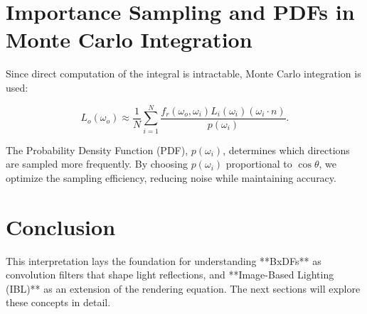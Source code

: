 \documentclass{article}
\begin{document}
\section{Importance Sampling and PDFs in Monte Carlo Integration}
Since direct computation of the integral is intractable, Monte Carlo integration is used:

\begin{equation}
L_o(\omega_o) \approx \frac{1}{N} \sum_{i=1}^{N} \frac{f_r(\omega_o, \omega_i) L_i(\omega_i) (\omega_i \cdot n)}{p(\omega_i)}.
\end{equation}

The Probability Density Function (PDF), \( p(\omega_i) \), determines which directions are sampled more frequently. By choosing \( p(\omega_i) \) proportional to \( \cos\theta \), we optimize the sampling efficiency, reducing noise while maintaining accuracy.

\section{Conclusion}
This interpretation lays the foundation for understanding **BxDFs** as convolution filters that shape light reflections, and **Image-Based Lighting (IBL)** as an extension of the rendering equation. The next sections will explore these concepts in detail.
\end{document}
